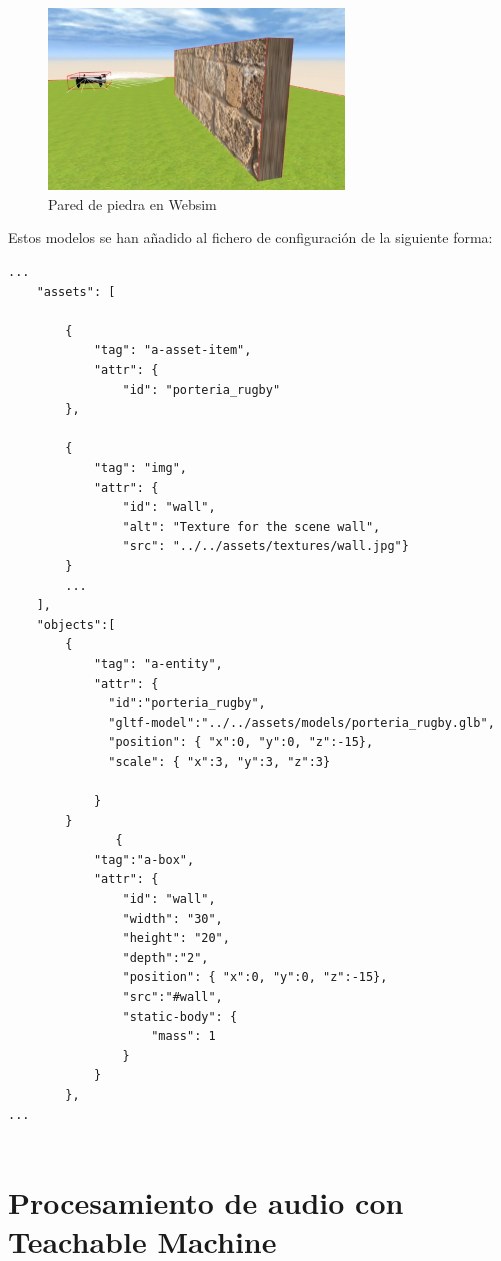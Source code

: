 \begin{figure}[H]
\centering
    \includegraphics[width=0.7\textwidth, height=0.5\textwidth]{chapters/images/pared.png}
    \caption{Pared de piedra en Websim}
    \label{fig:f1}
  \end{figure}

Estos modelos se han añadido al fichero de configuración de la siguiente forma:
\begin{lstlisting}
...
    "assets": [

        {
            "tag": "a-asset-item",
            "attr": {
                "id": "porteria_rugby"
		},
		
		{
            "tag": "img",
            "attr": {
                "id": "wall",
                "alt": "Texture for the scene wall",
                "src": "../../assets/textures/wall.jpg"}
        }
		...
    ],
    "objects":[ 
        {
            "tag": "a-entity",
            "attr": {
              "id":"porteria_rugby",
              "gltf-model":"../../assets/models/porteria_rugby.glb",
              "position": { "x":0, "y":0, "z":-15},
              "scale": { "x":3, "y":3, "z":3}

            }
        }
               {
            "tag":"a-box",
            "attr": {
                "id": "wall",
                "width": "30",
                "height": "20",
                "depth":"2",
                "position": { "x":0, "y":0, "z":-15},
                "src":"#wall",
                "static-body": {
                    "mass": 1
                }
            }
        },
...
  
\end{lstlisting}




\section{Procesamiento de audio con Teachable Machine}

